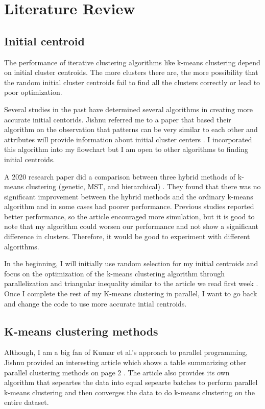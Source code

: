 \documentclass[a4paper,10pt]{article}
\begin{document}
\section{Literature Review}
\subsection{Initial centroid}
The performance of iterative clustering algorithms like k-means clustering depend on initial cluster centroids. 
The more clusters there are, the more possibility that the random initial cluster centroids fail to find all 
the clusters correctly or lead to poor optimization. 

Several studies in the past have determined several algorithms in creating more accurate initial centorids. 
Jishnu referred me to a paper that based their algorithm on the observation that patterns can be very similar to 
each other and attributes will provide information about initial cluster centers \cite{khan2004cluster}. I 
incorporated this algorithm into my flowchart but I am open to other algorithms to finding initial centroids.

A 2020 research paper did a comparison between three hybrid methods of k-means clustering (genetic, MST, and 
hierarchical) \cite{pourahmad2020does}. They found that there was no significant improvement between the hybrid 
methods and the ordinary k-means algorithm and in some cases had poorer performance. Previous studies reported 
better performance, so the article encouraged more simulation, but it is good to note that my algorithm could 
worsen our performance and not show a significant difference in clusters. Therefore, it would be good to 
experiment with different algorithms.

In the beginning, I will initially use random selection for my initial centroids and focus on the optimization 
of the k-means clustering algorithm through parallelization and triangular inequality similar to the article we 
read first week \cite{kumar2011parallel}. Once I complete the rest of my K-means clustering in parallel, I want 
to go back and change the code to use more accurate intial centroids.

\subsection{K-means clustering methods}
Although, I am a big fan of Kumar et al.'s approach to parallel programming, Jishnu provided an interesting article 
which shows a table summarizing other parallel clustering methods on page 2 \cite{aliguliyev2021parallel}. The article also provides its own 
algorithm that sepeartes the data into equal sepearte batches to perform parallel k-means clustering and then 
converges the data to do k-means clustering on the entire dataset.



\end{document}
